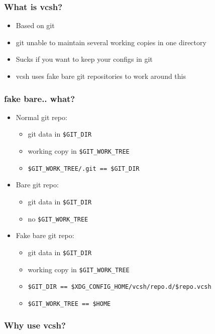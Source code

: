 \documentclass[t]{beamer}
\begin{document}
\begin{frame}
	\frametitle{What is vcsh?}
	\begin{itemize}
		\item Based on git
		\item git unable to maintain several working copies in one directory
		\item Sucks if you want to keep your configs in git
		\item vcsh uses fake bare git repositories to work around this
	\end{itemize}
\end{frame}

\begin{frame}
	\frametitle{fake bare.. what?}
	\begin{itemize}
		\item Normal git repo:
		\begin{itemize}
			\item git data in \texttt{\$GIT\_DIR}
			\item working copy in \texttt{\$GIT\_WORK\_TREE}
			\item \texttt{\$GIT\_WORK\_TREE/.git == \$GIT\_DIR}
		\end{itemize}
		\item Bare git repo:
		\begin{itemize}
			\item git data in \texttt{\$GIT\_DIR}
			\item no  \texttt{\$GIT\_WORK\_TREE}
		\end{itemize}
		\item Fake bare git repo:
		\begin{itemize}
			\item git data in \texttt{\$GIT\_DIR}
			\item working copy in \texttt{\$GIT\_WORK\_TREE}
			\item \texttt{\$GIT\_DIR == \$XDG\_CONFIG\_HOME/vcsh/repo.d/\$repo.vcsh}
			\item \texttt{\$GIT\_WORK\_TREE == \$HOME}
		\end{itemize}
	\end{itemize}
\end{frame}

\begin{frame}
	\frametitle{Why use vcsh?}
	\begin{itemize}
		\item Several \texttt{\$GIT\_WORK\_TREE} in \texttt$HOME}
		\item 
		\item 
		\item 
		\item 
	\end{itemize}
\end{frame}
\end{document}
